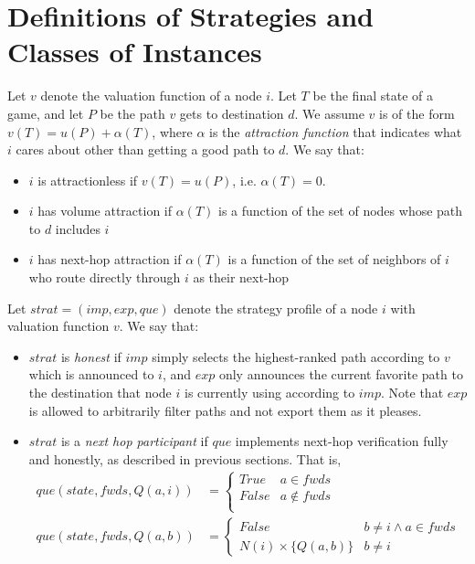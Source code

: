 \documentclass[12pt]{article}
\begin{document}
\section{Definitions of Strategies and Classes of Instances}
  Let $v$ denote the valuation function of a node $i$.
  Let $T$ be the final state of a game, and let $P$ be the path
  $v$ gets to destination $d$. We assume $v$ is of the form
  $v(T) = u(P) + \alpha(T)$, where $\alpha$ is the 
  \emph{attraction function} that indicates what $i$ cares about
  other than getting a good path to $d$.
  We say that:
  \begin{itemize}
    \item $i$ is attractionless if $v(T) = u(P)$, i.e. $\alpha(T) = 0$.
    \item $i$ has volume attraction if $\alpha(T)$ is a function
      of the set of nodes whose path to $d$ includes $i$
    \item $i$ has next-hop attraction if $\alpha(T)$ is a function
      of the set of neighbors of $i$ who route directly through $i$
      as their next-hop
  \end{itemize}

  Let $strat = (imp, exp, que)$ denote the strategy profile of a node
  $i$ with valuation function $v$.
  We say that:
  \begin{itemize}
    \item $strat$ is \emph{honest} if $imp$ simply selects the highest-ranked
      path according to $v$ which is announced to $i$, and
      $exp$ only announces the current favorite
      path to the destination that node $i$ is currently using according to $imp$.
      Note that $exp$ is allowed to arbitrarily filter paths and not
      export them as it pleases.
    \item $strat$ is a \emph{next hop participant} if $que$ implements
      next-hop verification fully and honestly, as described in
      previous sections. That is,
      \begin{align*}
        que(state, fwds, Q(a,i)) & =
        \begin{cases}
          True & a \in fwds \\
          False & a \notin fwds \\
        \end{cases}
        \\
        que(state, fwds, Q(a,b)) & =
        \begin{cases}
          False & b\ne i \wedge a \in fwds \\
          N(i) \times \{Q(a,b)\} & b\ne i
        \end{cases}
      \end{align*}
  \end{itemize}
\end{document}
